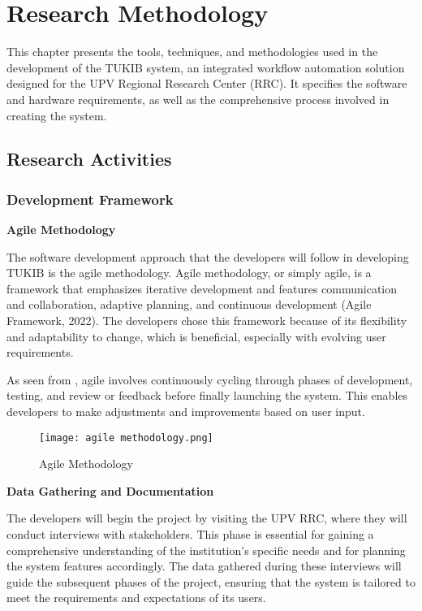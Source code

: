 \chapter{Research Methodology}
This chapter presents the tools, techniques, and methodologies used in the development of the TUKIB system, an integrated workflow automation solution designed for the UPV Regional Research Center (RRC). It specifies the software and hardware requirements, as well as the comprehensive process involved in creating the system.

\section{Research Activities}

\subsection{Development Framework}

\textbf{Agile Methodology}

The software development approach that the developers will follow in developing TUKIB is the agile methodology. Agile methodology, or simply agile, is a framework that emphasizes iterative development and features communication and collaboration, adaptive planning, and continuous development (Agile Framework, 2022). The developers chose this framework because of its flexibility and adaptability to change, which is beneficial, especially with evolving user requirements. 

As seen from , agile involves continuously cycling through phases of development, testing, and review or feedback before finally launching the system. This enables developers to make adjustments and improvements based on user input. 

\begin{figure}[h]
	\centering 
	\texttt{[image: agile methodology.png]}
	\caption{Agile Methodology}
	\label{fig:agile}
\end{figure}

\noindent\textbf{Data Gathering and Documentation}
	
The developers will begin the project by visiting the UPV RRC, where they will conduct interviews with stakeholders. This phase is essential for gaining a comprehensive understanding of the institution's specific needs and for planning the system features accordingly. The data gathered during these interviews will guide the subsequent phases of the project, ensuring that the system is tailored to meet the requirements and expectations of its users. 

